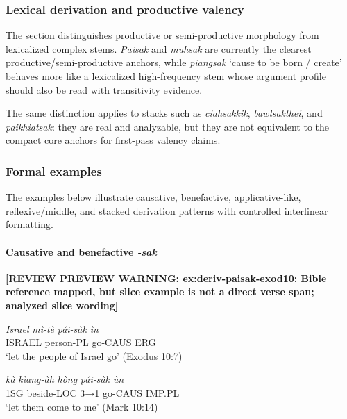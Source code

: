 \documentclass[
  11pt,
  a4paper,
]{article}
\newcommand{\tdim}[1]{\textit{#1}}
\newcommand{\tdimword}[1]{\textit{#1}}
\renewcommand{\textsc}[1]{{\footnotesize\MakeUppercase{#1}}}
\newcommand{\glossquote}[1]{`#1'}
\newcommand{\reviewwarninginline}[1]{\textbf{#1}\par\smallskip}
\begin{document}
\subsubsection{Lexical derivation and productive
valency}\label{lexical-derivation-and-productive-valency-1}

The section distinguishes productive or semi-productive morphology from
lexicalized complex stems. \tdim{Paisak} and \tdim{muhsak} are currently
the clearest productive/semi-productive anchors, while \tdim{piangsak}
\glossquote{cause to be born / create} behaves more like a lexicalized
high-frequency stem whose argument profile should also be read with
transitivity evidence.

The same distinction applies to stacks such as \tdim{ciahsakkik},
\tdim{bawlsakthei}, and \tdim{paikhiatsak}: they are real and
analyzable, but they are not equivalent to the compact core anchors for
first-pass valency claims.

\subsubsection{Formal examples}\label{formal-examples-2}

The examples below illustrate causative, benefactive, applicative-like,
reflexive/middle, and stacked derivation patterns with controlled
interlinear formatting.

\paragraph{\texorpdfstring{Causative and benefactive
\tdim{-sak}}{Causative and benefactive }}\label{causative-and-benefactive}

\begin{exe}
\ex \label{ex:deriv-paisak-exod10}
\reviewwarninginline{[REVIEW PREVIEW WARNING: ex:deriv-paisak-exod10: Bible reference mapped, but slice example is not a direct verse span; analyzed slice wording]}
\gll \tdimword{Israel} \tdimword{mì-tè} \tdimword{pái-sàk} \tdimword{ìn} \\
     \textsc{israel} person-\textsc{pl} go-\textsc{caus} \textsc{erg} \\
\glt \glossquote{let the people of Israel go} (Exodus 10:7)
\end{exe}

\begin{exe}
\ex \label{ex:deriv-paisak-mark10}
\gll \tdimword{kà} \tdimword{kìang-àh} \tdimword{hòng} \tdimword{pái-sàk} \tdimword{ùn} \\
     \textsc{1sg} beside-\textsc{loc} \textsc{3→1} go-\textsc{caus} \textsc{imp}.\textsc{pl} \\
\glt \glossquote{let them come to me} (Mark 10:14)
\end{exe}
\end{document}
